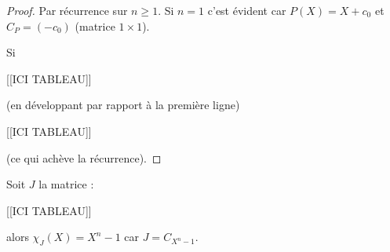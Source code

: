 \documentclass[class=report,crop=false]{standalone}
\begin{document}
\begin{proof}
Par récurrence sur $n \ge 1$. Si $n=1$ c'est évident car $P(X)= X +c_0$ et $C_P=(-c_0)$ (matrice $1 \times 1$).

Si 

[[ICI TABLEAU]]
%

(en développant par rapport à la première ligne)

[[ICI TABLEAU]]



(ce qui achève la récurrence).

\end{proof}

\begin{exemple}
Soit $J$ la matrice :

[[ICI TABLEAU]]



alors $\chi_J(X) = X^n-1$ car $J=C_{X^n-1}$.
\end{exemple}
\vskip 1cm
\end{document}
